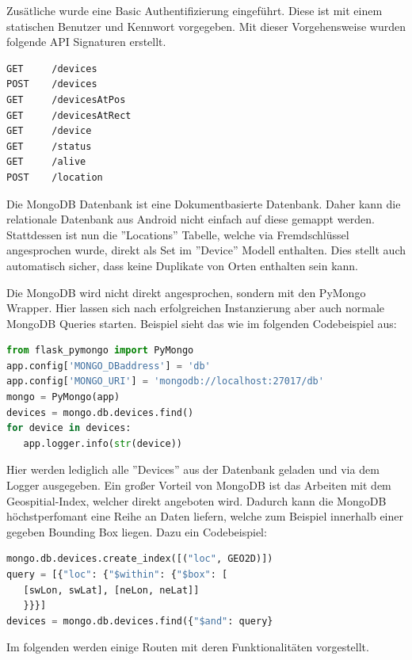 \documentclass[11pt,a4paper]{article}
\begin{document}
\noindent Zusätliche wurde eine Basic Authentifizierung eingeführt. Diese ist mit einem statischen Benutzer und Kennwort vorgegeben.
Mit dieser Vorgehensweise wurden folgende API Signaturen erstellt. 

\begin{lstlisting}[]
GET     /devices
POST	/devices
GET     /devicesAtPos
GET     /devicesAtRect
GET     /device
GET     /status
GET     /alive
POST    /location
\end{lstlisting}

Die MongoDB Datenbank ist eine Dokumentbasierte Datenbank. Daher kann die relationale Datenbank aus Android nicht einfach auf diese gemappt werden. Stattdessen ist nun die ''Locations'' Tabelle, welche via Fremdschlüssel angesprochen wurde, direkt als Set im ''Device'' Modell enthalten. Dies stellt auch automatisch sicher, dass keine Duplikate von Orten enthalten sein kann.

Die MongoDB wird nicht direkt angesprochen, sondern mit den PyMongo Wrapper. Hier lassen sich nach erfolgreichen Instanzierung aber auch normale MongoDB Queries starten. Beispiel sieht das wie im folgenden Codebeispiel aus:

\begin{lstlisting}[language=Python]
from flask_pymongo import PyMongo
app.config['MONGO_DBaddress'] = 'db'
app.config['MONGO_URI'] = 'mongodb://localhost:27017/db'
mongo = PyMongo(app)
devices = mongo.db.devices.find()
for device in devices:
   app.logger.info(str(device))
\end{lstlisting}

Hier werden lediglich alle ''Devices'' aus der Datenbank geladen und via dem Logger ausgegeben. 
Ein großer Vorteil von MongoDB ist das Arbeiten mit dem Geospitial-Index, welcher direkt angeboten wird. Dadurch kann die MongoDB höchstperfomant eine Reihe an Daten liefern, welche zum Beispiel innerhalb einer gegeben Bounding Box liegen. Dazu ein Codebeispiel:

\begin{lstlisting}[language=Python]
mongo.db.devices.create_index([("loc", GEO2D)])
query = [{"loc": {"$within": {"$box": [
   [swLon, swLat], [neLon, neLat]]
   }}}]
devices = mongo.db.devices.find({"$and": query}
\end{lstlisting}

\newpage
\noindent
Im folgenden werden einige Routen mit deren Funktionalitäten vorgestellt.
\end{document}
